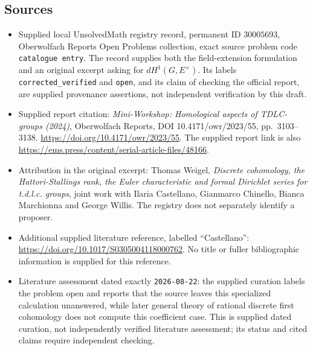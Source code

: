 \documentclass[11pt]{article}
\begin{document}
\subsection{Sources}
\begin{itemize}
\item Supplied local UnsolvedMath registry record, permanent ID \(30005693\), Oberwolfach Reports Open Problems collection, exact source problem code \texttt{catalogue entry}. The record supplies both the field-extension formulation and an original excerpt asking for \(dH^1(G,E^\times)\). Its labels \texttt{corrected\_verified} and \texttt{open}, and its claim of checking the official report, are supplied provenance assertions, not independent verification by this draft.
\item Supplied report citation: \emph{Mini-Workshop: Homological aspects of TDLC-groups (2024)}, Oberwolfach Reports, DOI 10.4171/owr/2023/55, pp.\ 3103--3138. \url{https://doi.org/10.4171/owr/2023/55}. The supplied report link is also \url{https://ems.press/content/serial-article-files/48166}.
\item Attribution in the original excerpt: Thomas Weigel, \emph{Discrete cohomology, the Hattori-Stallings rank, the Euler characteristic and formal Dirichlet series for t.d.l.c. groups}, joint work with Ilaria Castellano, Gianmarco Chinello, Bianca Marchionna and George Willis. The registry does not separately identify a proposer.
\item Additional supplied literature reference, labelled ``Castellano'': \url{https://doi.org/10.1017/S0305004118000762}. No title or fuller bibliographic information is supplied for this reference.
\item Literature assessment dated exactly \texttt{2026-08-22}: the supplied curation labels the problem open and reports that the source leaves this specialized calculation unanswered, while later general theory of rational discrete first cohomology does not compute this coefficient case. This is supplied dated curation, not independently verified literature assessment; its status and cited claims require independent checking.
\end{itemize}
\end{document}

